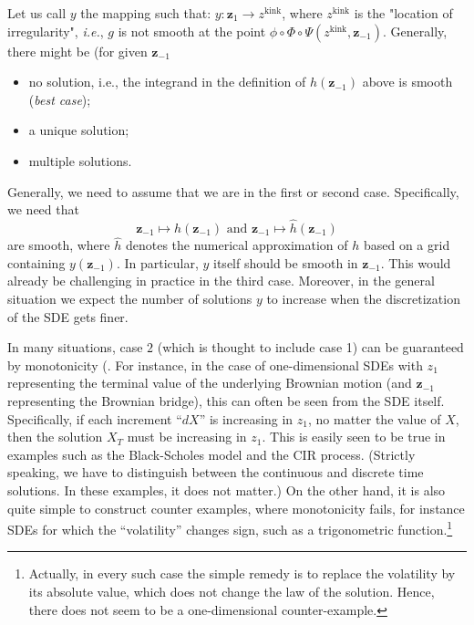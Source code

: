 \documentclass[11pt]{article}
\newcommand{\ie}{\emph{i.e.}}
\begin{document}
Let us call $y$ the mapping such that: $y: \mathbf{z}_1 \rightarrow z^{\text{kink}}$, where  $z^{\text{kink}}$ is   the "location of
irregularity", \ie,  $g$ is not smooth at the point $\phi \circ \Phi \circ \Psi(z^{\text{kink}}, \mathbf{z}_{-1})$. Generally, there might be (for given $\mathbf{z}_{-1}$
\begin{itemize}
	\item no solution, i.e., the integrand in the definition of $h(\mathbf{z}_{-1})$ above
	is smooth (\textit{best case});
	\item a unique solution;
	\item multiple solutions.
\end{itemize}

Generally, we need to assume that we are in the first or second
case. Specifically, we need that
\begin{equation*}
	\mathbf{z}_{-1} \mapsto h(\mathbf{z}_{-1}) \text{ and } \mathbf{z}_{-1} \mapsto \hat{h}(\mathbf{z}_{-1})
\end{equation*}
are smooth, where $\hat{h}$ denotes the numerical approximation of $h$ based
on a grid containing $y(\mathbf{z}_{-1})$. In particular, $y$ itself should be smooth
in $\mathbf{z}_{-1}$. This would already be challenging in practice in the third
case. Moreover, in the general situation we expect the number of solutions $y$
to increase when the discretization of the SDE gets finer.



In many situations, case $2$ (which is thought to include case 1) can be
guaranteed by monotonicity (. For instance, in the case of one-dimensional SDEs
with $z_1$ representing the terminal value of the underlying Brownian motion (and $\mathbf{z}_{-1}$ representing the Brownian bridge), this can often be seen from the SDE itself. Specifically, if each increment ``$dX$'' is increasing in $z_1$, no matter the value of $X$, then the solution $X_T$ must be increasing
in $z_1$. This is easily seen to be true in examples such as the Black-Scholes model and the CIR process. (Strictly speaking, we have to distinguish between the continuous and discrete time solutions. In these examples, it does not matter.) On the other hand, it is also quite simple to construct counter examples, where monotonicity fails, for instance SDEs for which the ``volatility'' changes sign, such as a trigonometric function.\footnote{Actually, in every such case the simple remedy is to replace the volatility by its absolute value, which does not change the law of the solution. Hence, there does not seem to be a one-dimensional counter-example.}
\end{document}
